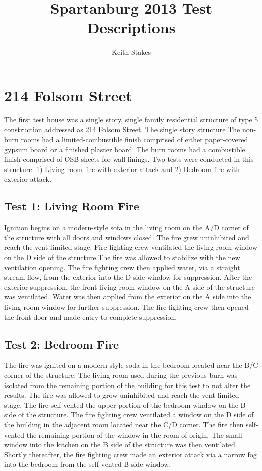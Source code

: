 \documentclass{article}
\title{Spartanburg 2013 Test Descriptions}
\author{Keith Stakes}
\begin{document}
\maketitle

\section{214 Folsom Street}

The first test house was a single story, single family residential structure of type 5 construction addressed as 214 Folsom Street.  The single story structure The non-burn rooms had a limited-combustible finish comprised of either paper-covered gypsum board or a finished plaster board.  The burn rooms had a combustible finish comprised of OSB sheets for wall linings.  Two tests were conducted in this structure: 1) Living room fire with exterior attack and 2) Bedroom fire with exterior attack.

\subsection{Test 1: Living Room Fire}

Ignition begins on a modern-style sofa in the living room on the A/D corner of the structure with all doors and windows closed. The fire grew uninhibited and reach the vent-limited stage. Fire fighting crew ventilated the living room window on the D side of the structure.The fire was allowed to stabilize with the new ventilation opening. The fire fighting crew then applied water, via a straight stream flow, from the exterior into the D side window for suppression.  After the exterior suppression, the front living room window on the A side of the structure was ventilated.  Water was then applied from the exterior on the A side into the living room window for further suppression. The fire fighting crew then opened the front door and made entry to complete suppression.

\subsection{Test 2: Bedroom Fire}

The fire was ignited on a modern-style soda in the bedroom located near the B/C corner of the structure.  The living room used during the previous burn was isolated from the remaining portion of the building for this test to not alter the results. The fire was allowed to grow uninhibited and reach the vent-limited stage. The fire self-vented the upper portion of the bedroom window on the B side of the structure.  The fire fighting crew ventilated a window on the D side of the building in the adjacent room located near the C/D corner.  The fire then self-vented the remaining portion of the window in the room of origin.  The small window into the kitchen on the B side of the structure was then ventilated.  Shortly thereafter, the fire fighting crew made an exterior attack via a narrow fog into the bedroom from the self-vented B side window.
\end{document}
